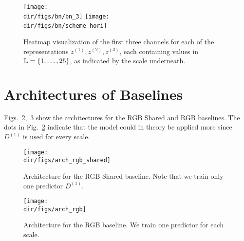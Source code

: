\begin{subappendices}
\begin{figure}[ht]
\centering
    \texttt{[image: \\dir/figs/bn/bn\_3]}\vspace{-0.9ex}
    \texttt{[image: \\dir/figs/bn/scheme\_hori]}\vspace{-3.1ex}
    {\tiny \textcolor{white}{1\hfill25}}
    \caption{\label{l3c:fig:bn}Heatmap visualization of the first three channels for each of the representations $z^{(1)}, z^{(2)}, z^{(3)}$, each containing values in $\mathbb{L}=\{1,\dots,25\}$, as indicated by the scale underneath.}
\end{figure}


\newpage

\section{Architectures of Baselines}
Figs.~\ref{l3c:fig:arch_rgb_shared},~\ref{l3c:fig:arch_rgb} show the architectures for the RGB Shared and RGB baselines. The dots in Fig.~\ref{l3c:fig:arch_rgb_shared} indicate that the model could in theory be applied more since $D^{(1)}$ is used for every scale. 

\null
\vfill

\begin{figure}[hb!]
\centering
\texttt{[image: \\dir/figs/arch\_rgb\_shared]}
    \caption{\label{l3c:fig:arch_rgb_shared}Architecture for the RGB Shared baseline. Note that we train only one predictor $D^{(1)}$.}
\end{figure}

\newpage

\null
\vfill

\begin{figure}[hb!]
\centering
\texttt{[image: \\dir/figs/arch\_rgb]}
    \vspace{1.8em}  %
    \caption{\label{l3c:fig:arch_rgb}Architecture for the RGB baseline. We train one predictor for each scale.}
\end{figure}

\FloatBarrier
\clearpage


%

\end{subappendices}

